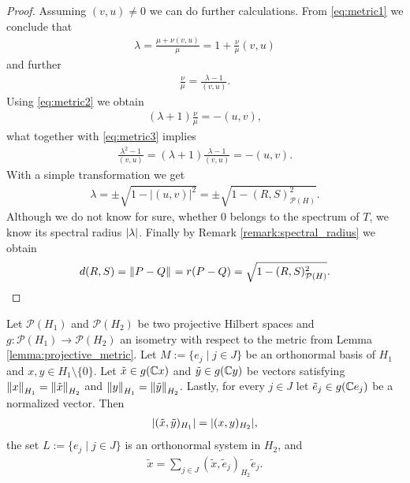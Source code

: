 \begin{proof}
	Assuming $(v,u) \neq 0$ we can do further calculations. From \eqref{eq:metric1} we conclude that
	\begin{align*}
		\lambda = \frac{\mu + \nu (v,u)}{\mu} = 1 + \frac{\nu}{\mu} (v,u) 
	\end{align*}
	and further
	\begin{align}
		\frac{\nu}{\mu} = \frac{\lambda - 1}{(v,u)}. \label{eq:metric3}
	\end{align}
	Using \eqref{eq:metric2} we obtain
	\begin{align*}
		 (\lambda + 1) \frac{\nu}{\mu} =  -(u,v), 
	\end{align*}
	what together with \eqref{eq:metric3} implies
	\begin{align*}
			\frac{\lambda^2 - 1}{(v,u)} = (\lambda + 1) \frac{\lambda - 1}{(v,u)} =  - (u,v).
	\end{align*}
	With a simple transformation we get
	\begin{align*}
		\lambda = \pm \sqrt{1 - |(u,v)|^2} = \pm \sqrt{1 - (R,S)_{\mathcal{P}(H)}^2}.
	\end{align*}
	Although we do not know for sure, whether $0$ belongs to the spectrum of $T$, we know its spectral radius $\vbraces{\lambda}$. Finally by Remark \ref{remark:spectral_radius} we obtain
	\begin{align*}
		d(R,S) = \norm{P - Q} = r(P - Q) = \sqrt{1 - (R,S)_{\mathcal{P}(H)}^2}.
	\end{align*}
\end{proof}


\begin{lemma}
	Let $\mathcal{P}(H_1)$ and $\mathcal{P}(H_2)$ be two projective Hilbert spaces and $g: \mathcal{P}(H_1) \to \mathcal{P}(H_2)$ an isometry with respect to the metric from Lemma \ref{lemma:projective_metric}. Let $M := \{e_j \mid j \in J\}$ be an orthonormal basis of $H_1$ and $x,y \in H_1 \setminus \{0\} $. Let $\tilde{x} \in g(\C x)$ and $\tilde{y} \in g(\C y)$  be vectors satisfying $\norm[H_1]{x} = \norm[H_2]{\tilde{x}}$ and $\norm[H_1]{y} = \norm[H_2]{\tilde{y}}$. Lastly, for every $j \in J$ let $\tilde{e}_j \in g(\C e_j)$ be a normalized vector. Then
	\begin{align} 
		\vbraces{(\tilde{x}, \tilde{y})_{H_1}} = \vbraces{(x, y)_{H_2}} \label{eq:vector_isometry},
	\end{align}
	the set $L:=\{e_j \mid j \in J\}$ is an orthonormal system in $H_2$, and 
	\begin{align}
	\tilde{x} = \sum_{j \in J} (\tilde{x}, \tilde{e}_j)_{H_2} \tilde{e}_j. \label{eq:ran_fourier}
	\end{align} 
\end{lemma}

